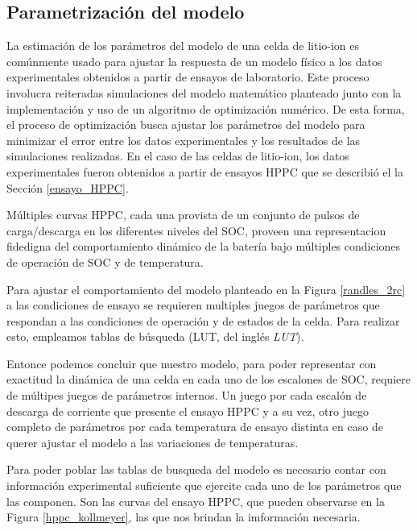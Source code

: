 \documentclass[10pt, a4paper]{report}
\begin{document}
\subsection{Parametrizaci\'on del modelo}\label{param_18650pf}

La estimaci\'on de los par\'ametros del modelo de una celda de litio-ion es
com\'unmente usado para ajustar la respuesta de un modelo f\'isico a los datos
experimentales obtenidos a partir de ensayos de laboratorio. Este proceso
involucra reiteradas simulaciones del modelo matem\'atico planteado junto con la
implementación y uso de un algoritmo de optimizaci\'on num\'erico. De esta
forma, el proceso de optimizaci\'on busca ajustar los par\'ametros del modelo
para minimizar el error entre los datos experimentales y los resultados de las
simulaciones realizadas. En el caso de las celdas de litio-ion, los datos
experimentales fueron obtenidos a partir de ensayos \acrfull{HPPC} que se
describió el la Sección \ref{ensayo_HPPC}. 

Múltiples curvas \acrshort{HPPC}, cada una provista de un conjunto de pulsos de
carga/descarga en los diferentes niveles del \acrshort{SOC}, proveen una
representacion fidedigna del comportamiento din\'amico de la bater\'ia bajo
múltiples condiciones de operación de \acrshort{SOC} y de temperatura.

Para ajustar el comportamiento del modelo planteado en la Figura
\ref{randles_2rc} a las condiciones de ensayo se requieren multiples juegos de
parámetros que respondan a las condiciones de operaci\'on y de estados de la
celda. Para realizar esto, empleamos tablas de b\'usqueda (\acrshort{LUT}, del
ingl\'es \emph{\acrlong{LUT}}).

Entonce podemos concluir que nuestro modelo, para poder representar con
exactitud la dinámica de una celda en cada uno de los escalones de
\acrshort{SOC}, requiere de múltipes juegos de parámetros internos. Un juego por
cada escalón de descarga de corriente que presente el ensayo \acrshort{HPPC} y a
su vez, otro juego completo de parámetros por cada temperatura de ensayo
distinta en caso de querer ajustar el modelo a las variaciones de temperaturas.

Para poder poblar las tablas de busqueda del modelo es necesario contar con
información experimental suficiente que ejercite cada uno de los parámetros que
las componen. Son las curvas del ensayo \acrshort{HPPC}, que pueden observarse
en la Figura \ref{hppc_kollmeyer}, las que nos brindan la imformación necesaria.
\end{document}
